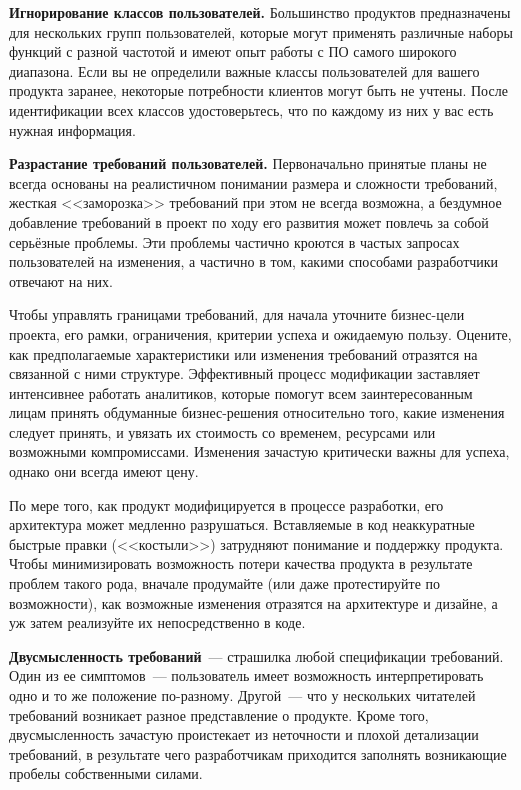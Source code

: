 \documentclass{../../text-style}
\begin{document}
\textbf{Игнорирование классов пользователей.} Большинство продуктов предназначены для нескольких групп пользователей, которые могут применять различные наборы функций с разной частотой и имеют опыт работы с ПО самого широкого диапазона. Если вы не определили важные классы пользователей для вашего продукта заранее, некоторые потребности клиентов могут быть не учтены. После идентификации всех классов удостоверьтесь, что по каждому из них у вас есть нужная информация.

\textbf{Разрастание требований пользователей.} Первоначально принятые планы не всегда основаны на реалистичном понимании размера и сложности требований, жесткая <<заморозка>> требований при этом не всегда возможна, а бездумное добавление требований в проект по ходу его развития может повлечь за собой серьёзные проблемы. Эти проблемы частично кроются в частых запросах пользователей на изменения, а частично в том, какими способами разработчики отвечают на них.

Чтобы управлять границами требований, для начала уточните бизнес-цели проекта, его рамки, ограничения, критерии успеха и ожидаемую пользу. Оцените, как предполагаемые характеристики или изменения требований отразятся на связанной с ними структуре. Эффективный процесс модификации заставляет интенсивнее работать аналитиков, которые помогут всем заинтересованным лицам принять обдуманные бизнес-решения относительно того, какие изменения следует принять, и увязать их стоимость со временем, ресурсами или возможными компромиссами. Изменения зачастую критически важны для успеха, однако они всегда имеют цену.

По мере того, как продукт модифицируется в процессе разработки, его архитектура может медленно разрушаться. Вставляемые в код неаккуратные быстрые правки (<<костыли>>) затрудняют понимание и поддержку продукта. Чтобы минимизировать возможность потери качества продукта в результате проблем такого рода, вначале продумайте (или даже протестируйте по возможности), как возможные изменения отразятся на архитектуре и дизайне, а уж затем реализуйте их непосредственно в коде.

\textbf{Двусмысленность требований}~--- страшилка любой спецификации требований. Один из ее симптомов~--- пользователь имеет возможность интерпретировать одно и то же положение по-разному. Другой~--- что у нескольких читателей требований возникает разное представление о продукте. Кроме того, двусмысленность зачастую проистекает из неточности и плохой детализации требований, в результате чего разработчикам приходится заполнять возникающие пробелы собственными силами.
\end{document}
